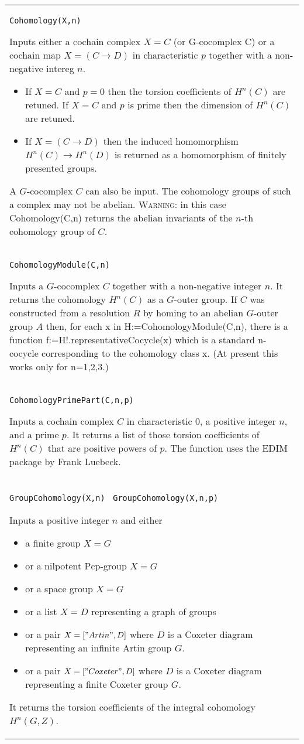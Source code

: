 \documentclass[a4paper,11pt]{report}
\begin{document}
{
 \begin{center}
\begin{tabular}{|l|} \index{Cohomology} \texttt{Cohomology(X,n) } 

 Inputs either a cochain complex $X=C$ (or G-cocomplex C) or a cochain map $X=(C \longrightarrow D)$ in characteristic $p$ together with a non-negative intereg $n$. 
\begin{itemize}
\item If $X=C$ and $p=0$ then the torsion coefficients of $H^n(C)$ are retuned. If $X=C$ and $p$ is prime then the dimension of $H^n(C)$ are retuned. 
\item If $X=(C \longrightarrow D)$ then the induced homomorphism $H^n(C)\longrightarrow H^n(D)$ is returned as a homomorphism of finitely presented groups. 
\end{itemize}
 A $G$-cocomplex $C$ can also be input. The cohomology groups of such a complex may not be abelian. \textsc{Warning:} in this case Cohomology(C,n) returns the abelian invariants of the $n$-th cohomology group of $C$. \\
 \index{CohomologyModule} \texttt{CohomologyModule(C,n) } 

 Inputs a $G$-cocomplex $C$ together with a non-negative integer $n$. It returns the cohomology $H^n(C)$ as a $G$-outer group. If $C$ was constructed from a resolution $R$ by homing to an abelian $G$-outer group $A$ then, for each x in H:=CohomologyModule(C,n), there is a function
f:=H!.representativeCocycle(x) which is a standard n-cocycle corresponding to
the cohomology class x. (At present this works only for n=1,2,3.) \\
 \index{CohomologyPrimePart} \texttt{CohomologyPrimePart(C,n,p)} 

 Inputs a cochain complex $C$ in characteristic 0, a positive integer $n$, and a prime $p$. It returns a list of those torsion coefficients of $H^n(C)$ that are positive powers of $p$. The function uses the EDIM package by Frank Luebeck. \\
 \index{GroupCohomology} \texttt{GroupCohomology(X,n) } \texttt{GroupCohomology(X,n,p)} 

 Inputs a positive integer $n$ and either 
\begin{itemize}
\item  a finite group $X=G$ 
\item  or a nilpotent Pcp-group $X=G$ 
\item  or a space group $X=G$ 
\item  or a list $X=D$ representing a graph of groups
\item or a pair $X=["Artin",D]$ where $D$ is a Coxeter diagram representing an infinite Artin group $G$.
\item or a pair $X=["Coxeter",D]$ where $D$ is a Coxeter diagram representing a finite Coxeter group $G$.
\end{itemize}
 It returns the torsion coefficients of the integral cohomology $H^n(G,Z)$. 


\end{tabular}
\end{center}}
\end{document}
